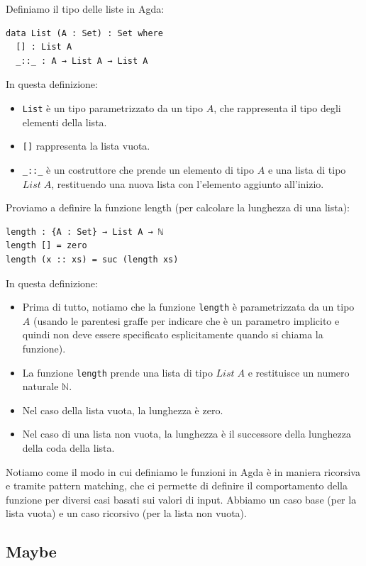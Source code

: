 \documentclass[a4paper]{article}
\theoremstyle{definition}
\theoremstyle{remark}
\begin{document}
Definiamo il tipo delle liste in Agda:
\begin{verbatim}
data List (A : Set) : Set where
  [] : List A
  _::_ : A → List A → List A
\end{verbatim}
In questa definizione:
\begin{itemize}
  \item \texttt{List} è un tipo parametrizzato da un tipo \( A \), che rappresenta il tipo degli elementi della lista.
  \item \texttt{[]} rappresenta la lista vuota.
  \item \texttt{\_::\_} è un costruttore che prende un elemento di tipo \( A \) e una lista di tipo \( List \; A \), restituendo una nuova lista con l'elemento aggiunto all'inizio.
\end{itemize}
Proviamo a definire la funzione length (per calcolare la lunghezza di una lista):
\begin{verbatim}
length : {A : Set} → List A → ℕ
length [] = zero
length (x :: xs) = suc (length xs)
\end{verbatim}
In questa definizione:
\begin{itemize}
  \item Prima di tutto, notiamo che la funzione \texttt{length} è parametrizzata da un tipo \( A \) (usando le parentesi graffe per indicare che è un parametro implicito e quindi
non deve essere specificato esplicitamente quando si chiama la funzione).
  \item La funzione \texttt{length} prende una lista di tipo \( List \; A \) e restituisce un numero naturale \( ℕ \).
  \item Nel caso della lista vuota, la lunghezza è zero.
  \item Nel caso di una lista non vuota, la lunghezza è il successore della lunghezza della coda della lista.
\end{itemize}
Notiamo come il modo in cui definiamo le funzioni in Agda
è in maniera ricorsiva e tramite pattern matching,
che ci permette di definire il comportamento della funzione
per diversi casi basati sui valori di input. Abbiamo un caso base (per la lista vuota)
e un caso ricorsivo (per la lista non vuota).

\subsection{Maybe}
\end{document}
